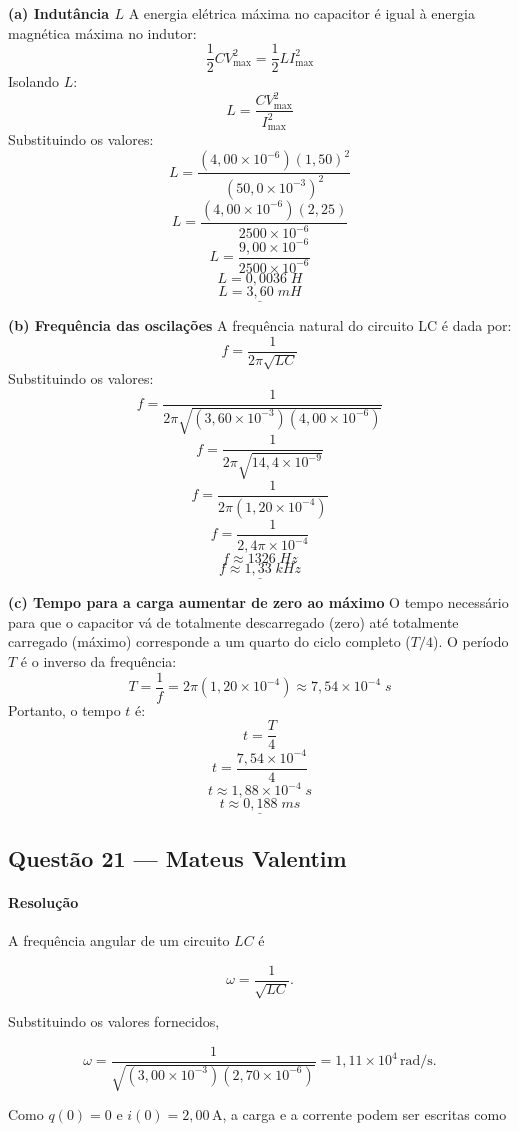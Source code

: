 \documentclass[12pt,a4paper]{article}
\begin{document}
\vspace{0.2cm}
\textbf{(a) Indutância \(L\)}
A energia elétrica máxima no capacitor é igual à energia magnética máxima no indutor:
\[\frac{1}{2}CV_{\max}^{2} = \frac{1}{2}LI_{\max}^{2}\]
Isolando \(L\):
\[L = \frac{CV_{\max}^{2}}{I_{\max}^{2}}\]
Substituindo os valores:
\[L = \frac{(4,00 \times 10^{-6})(1,50)^2}{(50,0 \times 10^{-3})^2}\]
\[L = \frac{(4,00 \times 10^{-6})(2,25)}{2500 \times 10^{-6}}\]
\[L = \frac{9,00 \times 10^{-6}}{2500 \times 10^{-6}}\]
\[L = 0,0036\;H\]
\[\underline{L = 3,60\;mH}\]

\vspace{0.2cm}
\textbf{(b) Frequência das oscilações}
A frequência natural do circuito LC é dada por:
\[f = \frac{1}{2\pi \sqrt{LC}}\]
Substituindo os valores:
\[f = \frac{1}{2\pi \sqrt{(3,60 \times 10^{-3})(4,00 \times 10^{-6})}}\]
\[f = \frac{1}{2\pi \sqrt{14,4 \times 10^{-9}}}\]
\[f = \frac{1}{2\pi (1,20 \times 10^{-4})}\]
\[f = \frac{1}{2,4\pi \times 10^{-4}}\]
\[f \approx 1326\;Hz\]
\[\underline{f \approx 1,33\;kHz}\]

\vspace{0.2cm}
\textbf{(c) Tempo para a carga aumentar de zero ao máximo}
O tempo necessário para que o capacitor vá de totalmente descarregado (zero) até totalmente carregado (máximo) corresponde a um quarto do ciclo completo (\(T/4\)).
O período \(T\) é o inverso da frequência:
\[T = \frac{1}{f} = 2\pi (1,20 \times 10^{-4}) \approx 7,54 \times 10^{-4}\;s\]
Portanto, o tempo \(t\) é:
\[t = \frac{T}{4}\]
\[t = \frac{7,54 \times 10^{-4}}{4}\]
\[t \approx 1,88 \times 10^{-4}\;s\]
\[\underline{t \approx 0,188\;ms}\]

\subsection{Questão 21 — Mateus Valentim}
\paragraph{Resolução}

A frequência angular de um circuito \(LC\) é

\[
\omega=\frac{1}{\sqrt{LC}}.
\]

Substituindo os valores fornecidos,

\[
\omega
=
\frac{1}
{\sqrt{(3,00\times10^{-3})(2,70\times10^{-6})}}
=
1,11\times10^{4}\,\mathrm{rad/s}.
\]

Como \(q(0)=0\) e \(i(0)=2,00\,\mathrm{A}\), a carga e a corrente podem ser escritas como
\end{document}
